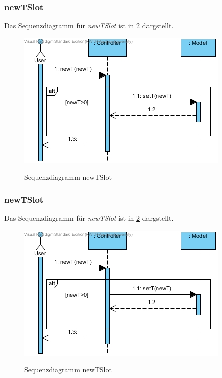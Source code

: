 \subsubsection*{newTSlot}

Das Sequenzdiagramm für \emph{newTSlot} ist in \ref{Sequenzdiagramm newTSlot} dargstellt.

\begin{figure}[H]
	\centering
	\includegraphics[scale=.6]{Bilder/Controller__newTSlot().jpg}\\
	\caption{Sequenzdiagramm newTSlot}
	\label{Sequenzdiagramm newTSlot}
\end{figure}

\subsubsection*{newTSlot}

Das Sequenzdiagramm für \emph{newTSlot} ist in \ref{Sequenzdiagramm newTSlot} dargstellt.

\begin{figure}[H]
	\centering
	\includegraphics[scale=.6]{Bilder/Controller__newTSlot().jpg}\\
	\caption{Sequenzdiagramm newTSlot}
	\label{Sequenzdiagramm newTSlot}
\end{figure}

